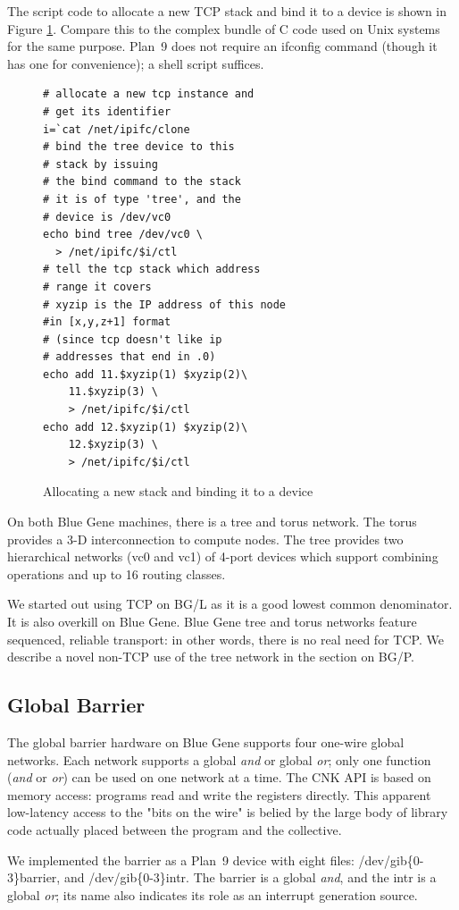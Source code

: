 \documentclass[letterpaper,twocolumn,10pt]{article}
\begin{document}
The script code to allocate a new TCP stack and bind it to a device is shown in Figure \ref{newstack}. Compare this to the complex bundle of C code used on Unix systems for the same purpose. Plan~9 does not require an ifconfig command (though it has one for convenience); a shell script suffices. 

\begin{figure}
\begin{verbatim}
# allocate a new tcp instance and 
# get its identifier
i=`cat /net/ipifc/clone
# bind the tree device to this 
# stack by issuing
# the bind command to the stack
# it is of type 'tree', and the 
# device is /dev/vc0
echo bind tree /dev/vc0 \
  > /net/ipifc/$i/ctl
# tell the tcp stack which address
# range it covers
# xyzip is the IP address of this node 
#in [x,y,z+1] format
# (since tcp doesn't like ip
# addresses that end in .0)
echo add 11.$xyzip(1) $xyzip(2)\
	11.$xyzip(3) \
	> /net/ipifc/$i/ctl
echo add 12.$xyzip(1) $xyzip(2)\
	12.$xyzip(3) \
	> /net/ipifc/$i/ctl
\end{verbatim}
\caption{\label{newstack}Allocating a new stack and binding it to a device}
\end{figure}

On both Blue Gene machines, there is a tree and torus network. The torus provides a 3-D interconnection to compute nodes. The tree provides two hierarchical networks (vc0 and vc1) of 4-port devices which support combining operations and up to 16 routing classes. 

We started out using TCP on BG/L as it is a good lowest common denominator. It is also overkill on Blue Gene. Blue Gene tree and torus networks feature sequenced, reliable transport: in other words, there is no real need for TCP. We describe a novel non-TCP use of the tree network in the section on BG/P. 
\subsection{Global Barrier}
The global barrier hardware on Blue Gene supports four one-wire global networks. Each network supports a global \textit{and} or global \textit{or}; only one function (\textit{and} or \textit{or}) can be used on one network at a time. The CNK API is based on memory access: programs read and write the registers directly. This apparent low-latency access to the "bits on the wire"  is belied by the large body of library code actually placed between the program and the collective. 

We implemented the barrier as a Plan~9 device with eight files: /dev/gib\{0-3\}barrier, and /dev/gib\{0-3\}intr. The barrier is a global \textit{and}, and the intr is a global \textit{or}; its name also indicates its role as an interrupt generation source. 
\end{document}

